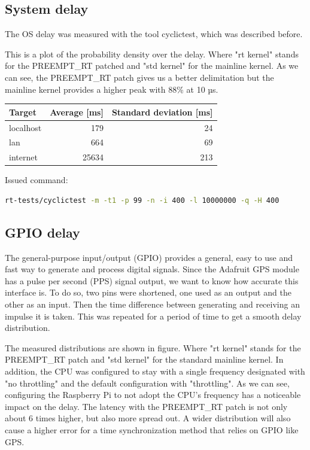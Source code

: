 \subsection{System delay}

The OS delay was measured with the tool cyclictest, which was described before.


This is a plot of the probability density over the delay. Where "rt kernel" stands for the PREEMPT\_RT patched and "std kernel" for the mainline kernel.
As we can see, the PREEMPT\_RT patch gives us a better delimitation but the mainline kernel provides a higher peak with 88\% at 10 µs.

\begin{center}
    \begin{tabular}{ | l | r | r | }
    \hline
    \textbf{Target} & \textbf{Average} [ms] & \textbf{Standard deviation} [ms] \\ \hline
    localhost & 179 & 24 \\ \hline
    lan & 664 & 69 \\ \hline
    internet & 25634 & 213 \\ \hline
    \end{tabular}
\end{center}

Issued command:

\begin{lstlisting}[language=bash]
rt-tests/cyclictest -m -t1 -p 99 -n -i 400 -l 10000000 -q -H 400
\end{lstlisting}

\subsection{GPIO delay}

The general-purpose input/output (GPIO) provides a general, easy to use and fast way to generate and process digital signals. Since the Adafruit GPS module has a pulse per second (PPS) signal output, we want to know how accurate this interface is.
To do so, two pins were shortened, one used as an output and the other as an input. Then the time difference between generating and receiving an impulse it is taken. This was repeated for a period of time to get a smooth delay distribution.


The measured distributions are shown in figure. Where "rt kernel" stands for the PREEMPT\_RT patch and "std kernel" for the standard mainline kernel. In addition, the CPU was configured to stay with a single frequency designated with "no throttling" and the default configuration with "throttling".
As we can see, configuring the Raspberry Pi to not adopt the CPU’s frequency has a noticeable impact on the delay. The latency with the PREEMPT\_RT patch is not only about 6 times higher, but also more spread out. A wider distribution will also cause a higher error for a time synchronization method that relies on GPIO like GPS.

